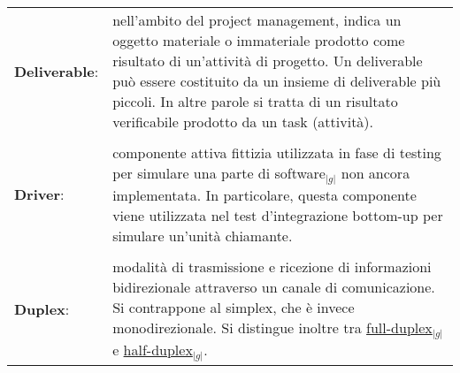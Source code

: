 \begin{longtable}{p{} p{}}
	    \textbf{Deliverable}:	&	nell’ambito del project management, indica un oggetto materiale o immateriale prodotto come risultato di un’attività di progetto. 
						Un deliverable può essere costituito da un insieme di deliverable più piccoli. In altre parole si tratta di un risultato verificabile prodotto da un task (attività).\\
	    \\
	    \textbf{Driver}:		&	componente attiva fittizia utilizzata in fase di testing per simulare una parte di software$_{|g|}$ non ancora implementata. In particolare,
						questa componente viene utilizzata nel test d'integrazione bottom-up per simulare un'unità chiamante.\\
	    \\
	    \textbf{Duplex}:		&	modalità di trasmissione e ricezione di informazioni bidirezionale attraverso un canale di comunicazione. Si contrappone al simplex, che è invece monodirezionale.
						Si distingue inoltre tra \underline{full-duplex}$_{|g|}$ e \underline{half-duplex}$_{|g|}$.\\
	\end{longtable}
\newpage


